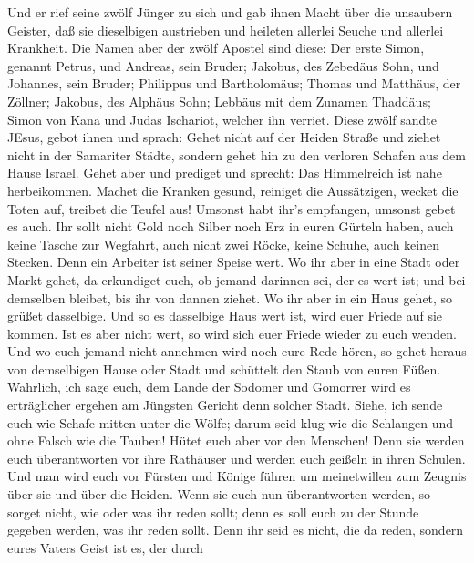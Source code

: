  Und er rief seine zwölf Jünger zu sich und gab ihnen Macht
über die unsaubern Geister, daß sie dieselbigen austrieben und heileten
allerlei Seuche und allerlei Krankheit.  Die Namen aber der
zwölf Apostel sind diese: Der erste Simon, genannt Petrus, und Andreas,
sein Bruder; Jakobus, des Zebedäus Sohn, und Johannes, sein Bruder;
 Philippus und Bartholomäus; Thomas und Matthäus, der
Zöllner; Jakobus, des Alphäus Sohn; Lebbäus mit dem Zunamen Thaddäus;
 Simon von Kana und Judas Ischariot, welcher ihn verriet.
 Diese zwölf sandte JEsus, gebot ihnen und sprach: Gehet
nicht auf der Heiden Straße und ziehet nicht in der Samariter Städte,
 sondern gehet hin zu den verloren Schafen aus dem Hause
Israel.  Gehet aber und prediget und sprecht: Das
Himmelreich ist nahe herbeikommen.  Machet die Kranken
gesund, reiniget die Aussätzigen, wecket die Toten auf, treibet die
Teufel aus! Umsonst habt ihr's empfangen, umsonst gebet es auch.
 Ihr sollt nicht Gold noch Silber noch Erz in euren Gürteln
haben,  auch keine Tasche zur Wegfahrt, auch nicht zwei
Röcke, keine Schuhe, auch keinen Stecken. Denn ein Arbeiter ist seiner
Speise wert.  Wo ihr aber in eine Stadt oder Markt gehet,
da erkundiget euch, ob jemand darinnen sei, der es wert ist; und bei
demselben bleibet, bis ihr von dannen ziehet.  Wo ihr aber
in ein Haus gehet, so grüßet dasselbige.  Und so es
dasselbige Haus wert ist, wird euer Friede auf sie kommen. Ist es aber
nicht wert, so wird sich euer Friede wieder zu euch wenden.
 Und wo euch jemand nicht annehmen wird noch eure Rede
hören, so gehet heraus von demselbigen Hause oder Stadt und schüttelt
den Staub von euren Füßen.  Wahrlich, ich sage euch, dem
Lande der Sodomer und Gomorrer wird es erträglicher ergehen am Jüngsten
Gericht denn solcher Stadt.  Siehe, ich sende euch wie
Schafe mitten unter die Wölfe; darum seid klug wie die Schlangen und
ohne Falsch wie die Tauben!  Hütet euch aber vor den
Menschen! Denn sie werden euch überantworten vor ihre Rathäuser und
werden euch geißeln in ihren Schulen.  Und man wird euch
vor Fürsten und Könige führen um meinetwillen zum Zeugnis über sie und
über die Heiden.  Wenn sie euch nun überantworten werden,
so sorget nicht, wie oder was ihr reden sollt; denn es soll euch zu der
Stunde gegeben werden, was ihr reden sollt.  Denn ihr seid
es nicht, die da reden, sondern eures Vaters Geist ist es, der durch
